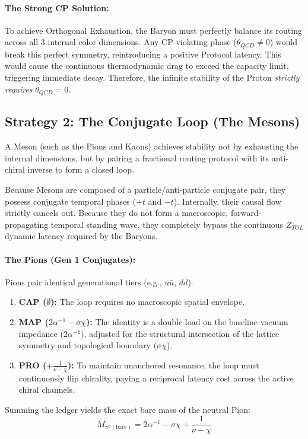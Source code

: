 \paragraph{The Strong CP Solution:}
To achieve Orthogonal Exhaustion, the Baryon must perfectly balance its routing across all 3 internal color dimensions. Any CP-violating phase ($\theta_{QCD} \neq 0$) would break this perfect symmetry, reintroducing a positive Protocol latency. This would cause the continuous thermodynamic drag to exceed the capacity limit, triggering immediate decay. Therefore, the infinite stability of the Proton \textit{strictly requires} $\theta_{QCD} = 0$. 

\subsection{Strategy 2: The Conjugate Loop (The Mesons)}

A Meson (such as the Pions and Kaons) achieves stability not by exhausting the internal dimensions, but by pairing a fractional routing protocol with its anti-chiral inverse to form a closed loop. 

Because Mesons are composed of a particle/anti-particle conjugate pair, they possess conjugate temporal phases ($+t$ and $-t$). Internally, their causal flow strictly cancels out. Because they do not form a macroscopic, forward-propagating temporal standing wave, they completely bypass the continuous $Z_{TOL}$ dynamic latency required by the Baryons.

\paragraph{The Pions (Gen 1 Conjugates):}
Pions pair identical generational tiers (e.g., $u\bar{u}$, $d\bar{d}$). 
\begin{enumerate}
    \item \textbf{CAP ($\emptyset$):} The loop requires no macroscopic spatial envelope.
    \item \textbf{MAP ($2\alpha^{-1} - \sigma\chi$):} The identity is a double-load on the baseline vacuum impedance ($2\alpha^{-1}$), adjusted for the structural intersection of the lattice symmetry and topological boundary ($\sigma\chi$).
    \item \textbf{PRO ($+\frac{1}{\nu-\chi}$):} To maintain unanchored resonance, the loop must continuously flip chirality, paying a reciprocal latency cost across the active chiral channels.
\end{enumerate}
Summing the ledger yields the exact bare mass of the neutral Pion: 
\begin{equation}
    M_{\pi^0 (\text{bare})} = 2\alpha^{-1} - \sigma\chi + \frac{1}{\nu-\chi}
\end{equation}

